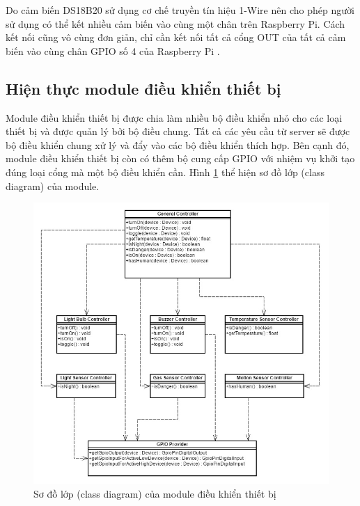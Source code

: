 \documentclass[12pt,a4paper,oneside]{extbook}
\begin{document}
\noindent
Do cảm biến DS18B20 sử dụng cơ chế truyền tín hiệu 1-Wire nên cho phép người sử dụng có thể kết nhiều cảm biến vào cùng một chân trên Raspberry Pi. Cách kết nối cũng vô cùng đơn giản, chỉ cần kết nối tất cả cổng OUT của tất cả cảm biến vào cùng chân GPIO số 4 của Raspberry Pi \cite{temp-sensor}.

\subsection{Hiện thực module điều khiển thiết bị}

Module điều khiển thiết bị được chia làm nhiều bộ điều khiển nhỏ cho các loại thiết bị và được quản lý bởi bộ điều chung. Tất cả các yêu cầu từ server sẽ được bộ điều khiển chung xử lý và đẩy vào các bộ điều khiển thích hợp. Bên cạnh đó, module điều khiển thiết bị còn có thêm bộ cung cấp GPIO với nhiệm vụ khởi tạo đúng loại cổng mà một bộ điều khiển cần. Hình \ref{fig:6-module-dieu-khien-class-diagram} thể hiện sơ đồ lớp (class diagram) của module.

\begin{figure}[h]
  \centering
     \includegraphics[width=15.5cm]{6-module-dieu-khien-class-diagram}
  \caption{Sơ đồ lớp (class diagram) của module điều khiển thiết bị}\label{fig:6-module-dieu-khien-class-diagram}
\end{figure}
\end{document}
